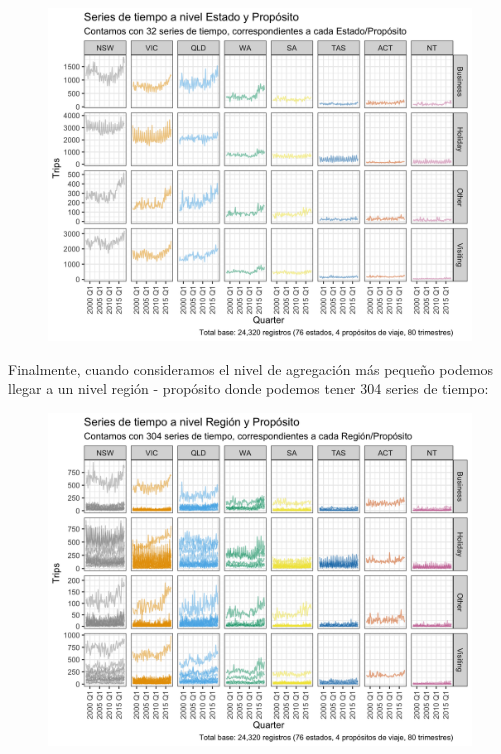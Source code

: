     \begin{figure}[!h]
    \centering
      \includegraphics[width=120mm]{imgs/02_ts_state_purpose.png}
      \label{fig:snowyplot}
    \end{figure}
    
\newpage 

Finalmente, cuando consideramos el nivel de agregación más pequeño podemos llegar a un nivel región -  propósito donde podemos tener 304 series de tiempo:

    \begin{figure}[!h]
    \centering
      \includegraphics[width=120mm]{imgs/03_ts_region_purpose.png}
      \label{fig:snowyplot}
    \end{figure}

\newpage
    
